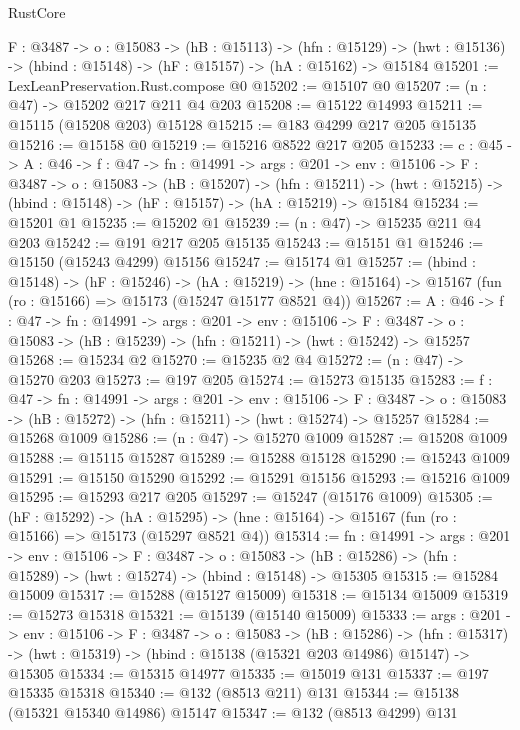 \begin{lexlean}{RustCore}
\begin{coremodule}
  {F : @3487} ->
  {o : @15083} ->
  (hB : @15113) ->
  (hfn : @15129) -> (hwt : @15136) -> (hbind : @15148) -> (hF : @15157) -> (hA : @15162) -> @15184
@15201 := LexLeanPreservation.Rust.compose @0
@15202 := @15107 @0
@15207 := (n : @47) -> @15202 @217 @211 @4 @203
@15208 := @15122 @14993
@15211 := @15115 (@15208 @203) @15128
@15215 := @183 @4299 @217 @205 @15135
@15216 := @15158 @0
@15219 := @15216 @8522 @217 @205
@15233 := {c : @45} ->
  {A : @46} ->
  {f : @47} ->
  {fn : @14991} ->
  {args : @201} ->
  {env : @15106} ->
  {F : @3487} ->
  {o : @15083} ->
  (hB : @15207) ->
  (hfn : @15211) -> (hwt : @15215) -> (hbind : @15148) -> (hF : @15157) -> (hA : @15219) -> @15184
@15234 := @15201 @1
@15235 := @15202 @1
@15239 := (n : @47) -> @15235 @211 @4 @203
@15242 := @191 @217 @205 @15135
@15243 := @15151 @1
@15246 := @15150 (@15243 @4299) @15156
@15247 := @15174 @1
@15257 := (hbind : @15148) ->
  (hF : @15246) ->
  (hA : @15219) -> (hne : @15164) -> @15167 (fun (ro : @15166) => @15173 (@15247 @15177 @8521 @4))
@15267 := {A : @46} ->
  {f : @47} ->
  {fn : @14991} ->
  {args : @201} ->
  {env : @15106} ->
  {F : @3487} -> {o : @15083} -> (hB : @15239) -> (hfn : @15211) -> (hwt : @15242) -> @15257
@15268 := @15234 @2
@15270 := @15235 @2 @4
@15272 := (n : @47) -> @15270 @203
@15273 := @197 @205
@15274 := @15273 @15135
@15283 := {f : @47} ->
  {fn : @14991} ->
  {args : @201} ->
  {env : @15106} ->
  {F : @3487} -> {o : @15083} -> (hB : @15272) -> (hfn : @15211) -> (hwt : @15274) -> @15257
@15284 := @15268 @1009
@15286 := (n : @47) -> @15270 @1009
@15287 := @15208 @1009
@15288 := @15115 @15287
@15289 := @15288 @15128
@15290 := @15243 @1009
@15291 := @15150 @15290
@15292 := @15291 @15156
@15293 := @15216 @1009
@15295 := @15293 @217 @205
@15297 := @15247 (@15176 @1009)
@15305 := (hF : @15292) ->
  (hA : @15295) -> (hne : @15164) -> @15167 (fun (ro : @15166) => @15173 (@15297 @8521 @4))
@15314 := {fn : @14991} ->
  {args : @201} ->
  {env : @15106} ->
  {F : @3487} ->
  {o : @15083} -> (hB : @15286) -> (hfn : @15289) -> (hwt : @15274) -> (hbind : @15148) -> @15305
@15315 := @15284 @15009
@15317 := @15288 (@15127 @15009)
@15318 := @15134 @15009
@15319 := @15273 @15318
@15321 := @15139 (@15140 @15009)
@15333 := {args : @201} ->
  {env : @15106} ->
  {F : @3487} ->
  {o : @15083} ->
  (hB : @15286) ->
  (hfn : @15317) -> (hwt : @15319) -> (hbind : @15138 (@15321 @203 @14986) @15147) -> @15305
@15334 := @15315 @14977
@15335 := @15019 @131
@15337 := @197 @15335 @15318
@15340 := @132 (@8513 @211) @131
@15344 := @15138 (@15321 @15340 @14986) @15147
@15347 := @132 (@8513 @4299) @131

\end{coremodule}
\end{lexlean}
